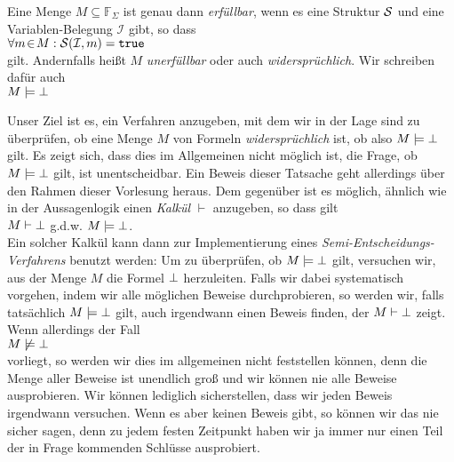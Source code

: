 \begin{Definition}
    Eine Menge $M \subseteq \mathbb{F}_\Sigma$ ist genau dann {\emph{\color{blue}erf\"{u}llbar}},
    wenn es eine Struktur $\mathcal{S}$ und eine Variablen-Belegung $\mathcal{I}$ gibt, so dass 
      \\[0.2cm]
    \hspace*{1.3cm} $\forall m \!\in\! M: \mathcal{S}(\mathcal{I},m) = \mathtt{true}$ \\[0.2cm]
    gilt.  Andernfalls hei\ss{}t $M$ {\emph{\color{blue}unerf\"{u}llbar}} oder auch {\emph{\color{blue}widerspr\"{u}chlich}}. 
    Wir schreiben daf\"{u}r auch \\[0.2cm]
    \hspace*{1.3cm} $M \models \bot$
    \eox
\end{Definition}

\noindent
Unser Ziel ist es, ein Verfahren anzugeben, mit dem wir in der Lage sind zu \"{u}berpr\"{u}fen,
ob eine Menge $M$ von Formeln {\emph{\color{blue}widerspr\"{u}chlich}} ist, ob also 
 $M \models \bot$ gilt.  Es zeigt sich, dass dies im Allgemeinen nicht
m\"{o}glich ist, die Frage, ob $M \models \bot$ gilt, ist unentscheidbar.  Ein Beweis
dieser Tatsache geht allerdings \"{u}ber den Rahmen dieser Vorlesung heraus.
Dem gegen\"{u}ber ist es m\"{o}glich, \"{a}hnlich wie in der Aussagenlogik
einen {\emph{\color{blue}Kalk\"{u}l}} $\vdash$ anzugeben, so dass gilt \\[0.2cm]
\hspace*{1.3cm} $M \vdash \bot$ \quad g.d.w. \quad $M \models \bot$. \\[0.2cm]
Ein solcher Kalk\"{u}l kann dann zur Implementierung eines
{\emph{\color{blue}Semi-Entscheidungs-Verfahrens}} benutzt werden:  Um zu \"{u}berpr\"{u}fen, ob
$M \models \bot$ gilt, versuchen wir, aus der Menge $M$ die Formel $\bot$
herzuleiten.  
Falls wir dabei systematisch vorgehen, indem wir alle m\"{o}glichen Beweise durchprobieren,
so werden wir, falls tats\"{a}chlich $M \models \bot$ gilt, auch irgendwann einen Beweis
finden, der $M \vdash \bot$ zeigt.   Wenn allerdings der Fall \\[0.2cm]
\hspace*{1.3cm}  $M \not\models \bot$ \\[0.2cm]
vorliegt,  so werden wir dies im allgemeinen nicht feststellen k\"{o}nnen, denn die Menge aller Beweise ist unendlich gro\ss{}
und wir k\"{o}nnen nie alle Beweise ausprobieren.  Wir k\"{o}nnen lediglich sicherstellen, dass
wir jeden Beweis irgendwann versuchen.  Wenn es aber keinen Beweis gibt, so k\"{o}nnen wir das
nie sicher sagen, denn zu jedem festen Zeitpunkt haben wir ja immer nur einen Teil der in
Frage kommenden Schl\"{u}sse ausprobiert.

